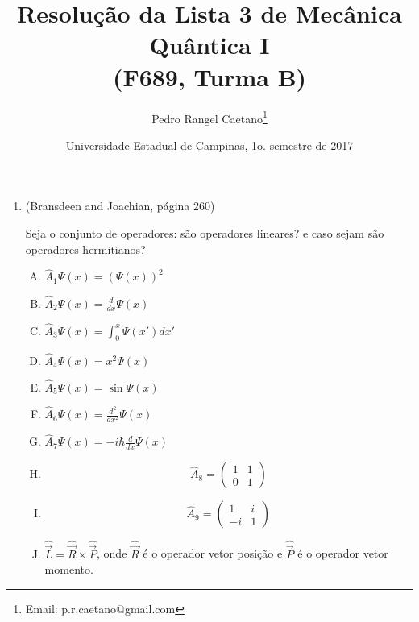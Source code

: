 \documentclass[a4paper, 12pt, notitlepage]{article}
\begin{document}
\title{Resolução da Lista 3 de Mecânica Quântica I\\ (F689, Turma B)}
\author{Pedro Rangel Caetano\footnote{Email: p.r.caetano@gmail.com}} 
\date{Universidade Estadual de Campinas, 1o. semestre de 2017}
\maketitle

\tableofcontents
\pagebreak

\begin{enumerate}

\item (Bransdeen and Joachian, página 260)

Seja o conjunto de operadores: são operadores lineares? e caso sejam são operadores hermitianos?

\begin{enumerate}[(A)]
  \item $\hat{A}_1 \Psi(x) = \left(\Psi(x)\right)^2$
  \item $\hat{A}_2 \Psi(x) = \frac{d}{dx} \Psi(x)$
  \item $\hat{A}_3 \Psi(x) = \int_0^x \Psi(x')dx'$
  \item $\hat{A}_4 \Psi(x) = x^2\Psi(x)$
  \item $\hat{A}_5 \Psi(x) = \sin \Psi(x)$
  \item $\hat{A}_6 \Psi(x) = \frac{d^2}{dx^2} \Psi(x)$
  \item $\hat{A}_7 \Psi(x) = -i\hbar \frac{d}{dx} \Psi(x)$
  \item
  \[ \hat{A}_8 = \begin{pmatrix} 1 & 1 \\ 0 & 1 \end{pmatrix} \]
  \item
  \[ \hat{A}_9 = \begin{pmatrix} 1 & i \\ -i & 1 \end{pmatrix} \]
  \item $\hat{\vec{L}} = \hat{\vec{R}} \times \hat{\vec{P}}$, onde $\hat{\vec{R}}$ é o operador vetor posição e $\hat{\vec{P}}$ é o operador vetor momento.
\end{enumerate}


\end{enumerate}
\end{document}
